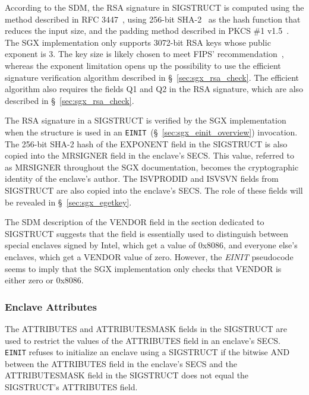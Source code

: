 According to the SDM, the RSA signature in SIGSTRUCT is computed using the
method described in RFC 3447~\cite{jonsson2003pkcsv21}, using 256-bit
SHA-2~\cite{fips2015shs} as the hash function that reduces the input size, and
the padding method described in PKCS \#1 v1.5~\cite{kaliski1998pkcs1v15}. The
SGX implementation only supports 3072-bit RSA keys whose public exponent is 3.
The key size is likely chosen to meet FIPS'
recommendation~\cite{fips2012keysize}, whereas the exponent limitation opens up
the possibility to use the efficient signature verification algorithm described
in \S~\ref{sec:sgx_rsa_check}. The efficient algorithm also requires the fields
Q1 and Q2 in the RSA signature, which are also described in
\S~\ref{sec:sgx_rsa_check}.

The RSA signature in a SIGSTRUCT is verified by the SGX implementation when the
structure is used in an \texttt{EINIT}~(\S~\ref{sec:sgx_einit_overview})
invocation. The 256-bit SHA-2 hash of the EXPONENT field in the SIGSTRUCT is
also copied into the MRSIGNER field in the enclave's SECS. This value, referred
to as MRSIGNER throughout the SGX documentation, becomes the cryptographic
identity of the enclave's author. The ISVPRODID and ISVSVN fields from
SIGSTRUCT are also copied into the enclave's SECS. The role of these fields
will be revealed in \S~\ref{sec:sgx_egetkey}.



The SDM description of the VENDOR field in the section dedicated to SIGSTRUCT
suggests that the field is essentially used to distinguish between special
enclaves signed by Intel, which get a value of 0x8086, and everyone else's
enclaves, which get a VENDOR value of zero. However, the \textit{EINIT}
pseudocode seems to imply that the SGX implementation only checks that
VENDOR is either zero or 0x8086.



\subsubsection{Enclave Attributes}
\label{sec:sgx_attributes}

The ATTRIBUTES and ATTRIBUTESMASK fields in the SIGSTRUCT are used to restrict
the values of the ATTRIBUTES field in an enclave's SECS. \texttt{EINIT} refuses
to initialize an enclave using a SIGSTRUCT if the bitwise AND between the
ATTRIBUTES field in the enclave's SECS and the ATTRIBUTESMASK field in the
SIGSTRUCT does not equal the SIGSTRUCT's ATTRIBUTES field.

